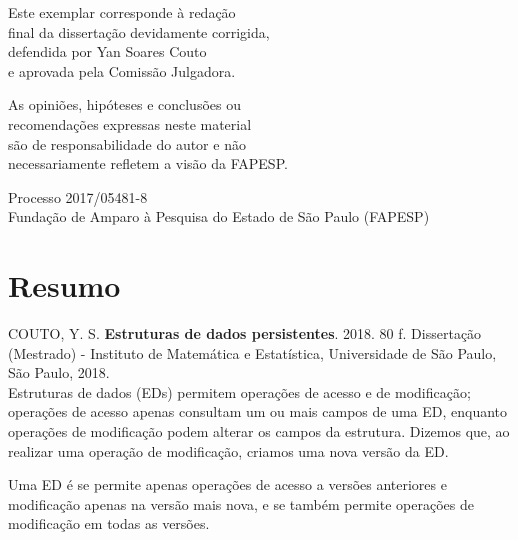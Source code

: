 \documentclass[11pt,oneside,a4paper, openany]{book}
\begin{document}
    \vskip 2cm

    \begin{flushright}
	Este exemplar corresponde à redação \\
	final da dissertação devidamente corrigida, \\
	defendida por Yan Soares Couto \\
	e aprovada pela Comissão Julgadora.
    \end{flushright}

    \vskip 2cm

    \begin{flushright}
	As opiniões, hipóteses e conclusões ou \\
	recomendações expressas neste material \\
	são de responsabilidade do autor e não \\
	necessariamente refletem a visão da FAPESP.
    \end{flushright}

    \vskip 2cm

    \begin{flushright}
	Processo 2017/05481-8 \\
	Fundação de Amparo à Pesquisa do Estado de São Paulo (FAPESP)
    \end{flushright}

\pagebreak

\chapter*{Resumo}

\noindent COUTO, Y. S. \textbf{Estruturas de dados persistentes}.
2018. 80 f.
Dissertação (Mestrado) - Instituto de Matemática e Estatística,
Universidade de São Paulo, São Paulo, 2018.
\\

Estruturas de dados (EDs) permitem operações de acesso e de modificação; operações de acesso apenas consultam um ou mais campos de uma ED, enquanto operações de modificação podem alterar os campos da estrutura. Dizemos que, ao realizar uma operação de modificação, criamos uma nova versão da ED.

Uma ED é  se permite apenas operações de acesso a versões anteriores e modificação apenas na versão mais nova, e  se também permite operações de modificação em todas as versões.
\end{document}
